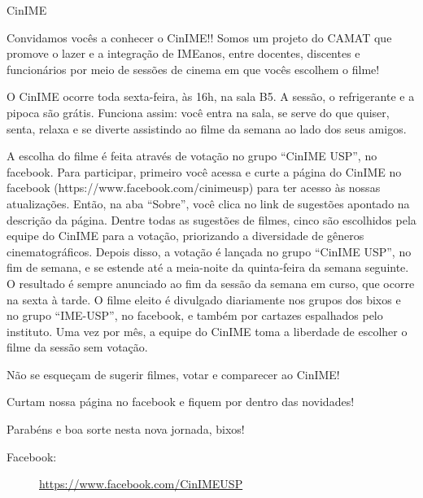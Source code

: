 \begin{subsecao}{CinIME}

Convidamos vocês a conhecer o CinIME!! Somos um projeto do CAMAT que promove o
lazer e a integração de IMEanos, entre docentes, discentes e funcionários por
meio de sessões de cinema em que vocês escolhem o filme!

O CinIME ocorre toda sexta-feira, às 16h, na sala B5. A sessão, o refrigerante
e a pipoca são grátis. Funciona assim: você entra na sala, se serve do que
quiser, senta, relaxa e se diverte assistindo ao filme da semana ao lado dos
seus amigos.

A escolha do filme é feita através de votação no grupo “CinIME USP”, no
facebook. Para participar, primeiro você acessa e curte a página do CinIME no
facebook (https://www.facebook.com/cinimeusp) para ter acesso às nossas
atualizações. Então, na aba “Sobre”, você clica no link de sugestões apontado
na descrição da página. Dentre todas as sugestões de filmes, cinco são
escolhidos pela equipe do CinIME para a votação, priorizando a diversidade de
gêneros cinematográficos. Depois disso, a votação é lançada no grupo “CinIME
USP”, no fim de semana, e se estende até a meia-noite da quinta-feira da semana
seguinte. O resultado é sempre anunciado ao fim da sessão da semana em curso,
que ocorre na sexta à tarde. O filme eleito é divulgado diariamente nos grupos
dos bixos e no grupo “IME-USP”, no facebook, e também por cartazes espalhados
pelo instituto. Uma vez por mês, a equipe do CinIME toma a liberdade de
escolher o filme da sessão sem votação.

Não se esqueçam de sugerir filmes, votar e comparecer ao CinIME!

Curtam nossa página no facebook e fiquem por dentro das novidades!

Parabéns e boa sorte nesta nova jornada, bixos!

\begin{description}
  \item[Facebook:] \url{https://www.facebook.com/CinIMEUSP}
\end{description}

\end{subsecao}
